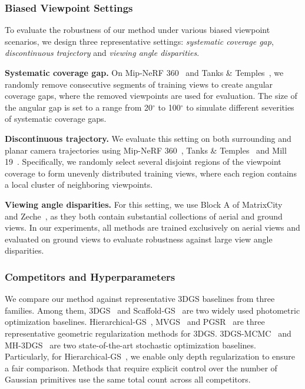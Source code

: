 \documentclass[lettersize,journal]{IEEEtran}
\begin{document}
\subsubsection{Biased Viewpoint Settings}

To evaluate the robustness of our method under various biased viewpoint scenarios, we design three representative settings: \emph{systematic coverage gap}, \emph{discontinuous trajectory} and \emph{viewing angle disparities}.

\textbf{Systematic coverage gap.}
On Mip-NeRF 360~\cite{mipnerf360} and Tanks \& Temples~\cite{tankstemples}, we randomly remove consecutive segments of training views to create angular coverage gaps, where the removed viewpoints are used for evaluation. 
The size of the angular gap is set to a range from 20$^\circ$ to 100$^\circ$ to simulate different severities of systematic coverage gaps.

\textbf{Discontinuous trajectory.}
We evaluate this setting on both surrounding and planar camera trajectories using Mip-NeRF 360~\cite{mipnerf360}, Tanks \& Temples~\cite{tankstemples} and Mill 19~\cite{meganerf}. Specifically, we randomly select several disjoint regions of the viewpoint coverage to form unevenly distributed training views, where each region contains a local cluster of neighboring viewpoints.

\textbf{Viewing angle disparities.}
For this setting, we use Block A of MatrixCity~\cite{matrixcity} and Zeche~\cite{isprs}, as they both contain substantial collections of aerial and ground views. In our experiments, all methods are trained exclusively on aerial views and evaluated on ground views to evaluate robustness against large view angle disparities.


\subsubsection{Competitors and Hyperparameters}

We compare our method against representative 3DGS baselines from three families. 
Among them, 3DGS~\cite{3dgs} and Scaffold-GS~\cite{scaffold} are two widely used photometric optimization baselines.
Hierarchical-GS~\cite{hierarchical}, MVGS~\cite{mvgs} and PGSR~\cite{pgsr} are three representative geometric regularization methods for 3DGS.
3DGS-MCMC~\cite{mcmc} and MH-3DGS~\cite{mh3dgs} are two state-of-the-art stochastic optimization baselines.
Particularly, for Hierarchical-GS~\cite{hierarchical}, we enable only depth regularization to ensure a fair comparison.
Methods that require explicit control over the number of Gaussian primitives use the same total count across all competitors. 
\end{document}
